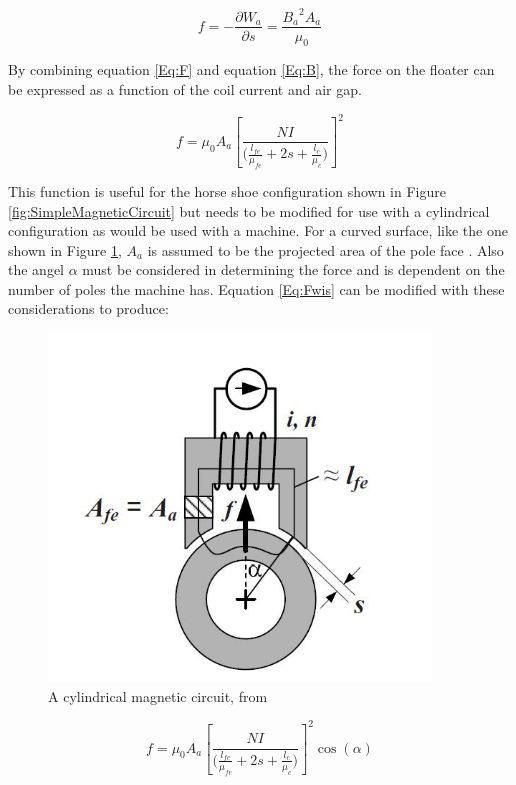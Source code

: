 \begin{equation}\label{Eq:F}
f=-\frac{\partial {W}_{a}}{\partial s}=\frac{{{B}_{a}}^{2}{A}_{a}}{{\mu}_{0}}
\end{equation}

By combining equation \ref{Eq:F} and equation \ref{Eq:B}, the force on the floater can be expressed as a function of the coil current and air gap.

\begin{equation}\label{Eq:Fwis}
f={\mu}_{0}{A}_{a}{\left[\frac{NI}{\Big(\frac{{l}_{fe}}{{\mu}_{fe}}+2s+\frac{{l}_{c}}{{\mu}_{c}}\Big)}\right]}^{2}
\end{equation}

This function is useful for the horse shoe configuration shown in Figure \ref{fig:SimpleMagneticCircuit} but needs to be modified for use with a cylindrical configuration as would be used with a machine. For a curved surface, like the one shown in Figure \ref{fig:CurvedMagneticCircuit},  $A_a$ is assumed to be the projected area of the pole face \cite{MagBear}. Also the angel $\alpha$ must be considered in determining the force and is dependent on the number of poles the machine has. Equation \ref{Eq:Fwis} can be modified with these considerations to produce:

\begin{figure}[!t]
	\centering
	\includegraphics[width=4in]{./Pictures/CircularMagneticCircuit.jpg}
	\caption{A cylindrical magnetic circuit, from \cite{MagBear}}
	\label{fig:CurvedMagneticCircuit}
\end{figure}

\begin{equation}\label{Eq:FwisAlpha}
f={\mu}_{0}{A}_{a}{\left[\frac{NI}{\Big(\frac{{l}_{fe}}{{\mu}_{fe}}+2s+\frac{{l}_{c}}{{\mu}_{c}}\Big)}\right]}^{2}\cos(\alpha)
\end{equation}

